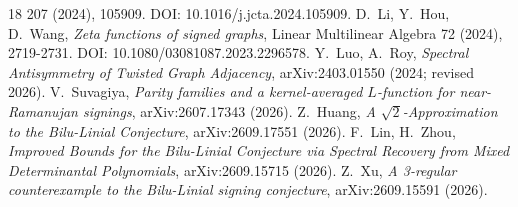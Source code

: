 \documentclass[11pt]{article}
\theoremstyle{remark}
\begin{document}
\begin{thebibliography}{18}
207 (2024), 105909. DOI: 10.1016/j.jcta.2024.105909.
 D.~Li, Y.~Hou, D.~Wang, \emph{Zeta functions of signed
graphs}, Linear Multilinear Algebra 72 (2024), 2719-2731.
DOI: 10.1080/03081087.2023.2296578.
 Y.~Luo, A.~Roy, \emph{Spectral Antisymmetry of Twisted Graph
Adjacency}, arXiv:2403.01550 (2024; revised 2026).
 V.~Suvagiya, \emph{Parity families and a kernel-averaged
$L$-function for near-Ramanujan signings}, arXiv:2607.17343 (2026).
 Z.~Huang, \emph{A $\sqrt2$-Approximation to the Bilu-Linial Conjecture},
arXiv:2609.17551 (2026).
 F.~Lin, H.~Zhou, \emph{Improved Bounds for the Bilu-Linial Conjecture via Spectral
Recovery from Mixed Determinantal Polynomials}, arXiv:2609.15715 (2026).
 Z.~Xu, \emph{A 3-regular counterexample to the Bilu-Linial signing conjecture},
arXiv:2609.15591 (2026).
\end{thebibliography}
\endgroup
\end{document}
